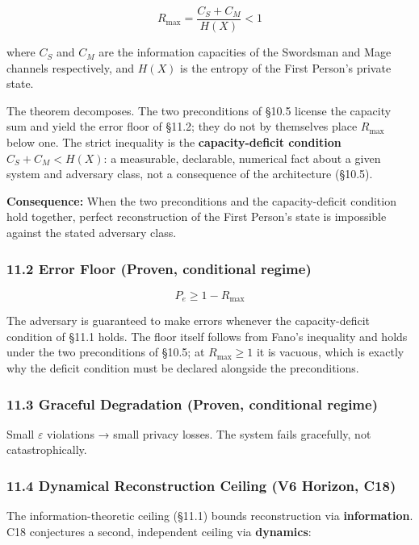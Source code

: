 \documentclass[
]{article}
\begin{document}
\[R_{\max} = \frac{C_S + C_M}{H(X)} < 1\]

where \(C_S\) and \(C_M\) are the information capacities of the
Swordsman and Mage channels respectively, and \(H(X)\) is the entropy of
the First Person's private state.

The theorem decomposes. The two preconditions of §10.5 license the
capacity sum and yield the error floor of §11.2; they do not by
themselves place \(R_{\max}\) below one. The strict inequality is the
\textbf{capacity-deficit condition} \(C_S + C_M < H(X)\): a measurable,
declarable, numerical fact about a given system and adversary class, not
a consequence of the architecture (§10.5).

\textbf{Consequence:} When the two preconditions and the
capacity-deficit condition hold together, perfect reconstruction of the
First Person's state is impossible against the stated adversary class.

\subsubsection{11.2 Error Floor (Proven, conditional
regime)}\label{error-floor-proven-conditional-regime}

\[P_e \geq 1 - R_{\max}\]

The adversary is guaranteed to make errors whenever the capacity-deficit
condition of §11.1 holds. The floor itself follows from Fano's
inequality and holds under the two preconditions of §10.5; at
\(R_{\max} \geq 1\) it is vacuous, which is exactly why the deficit
condition must be declared alongside the preconditions.

\subsubsection{11.3 Graceful Degradation (Proven, conditional
regime)}\label{graceful-degradation-proven-conditional-regime}

Small \(\varepsilon\) violations → small privacy losses. The system
fails gracefully, not catastrophically.

\subsubsection{11.4 Dynamical Reconstruction Ceiling (V6 Horizon,
C18)}\label{dynamical-reconstruction-ceiling-v6-horizon-c18}

The information-theoretic ceiling (§11.1) bounds reconstruction via
\textbf{information}. C18 conjectures a second, independent ceiling via
\textbf{dynamics}:
\end{document}
